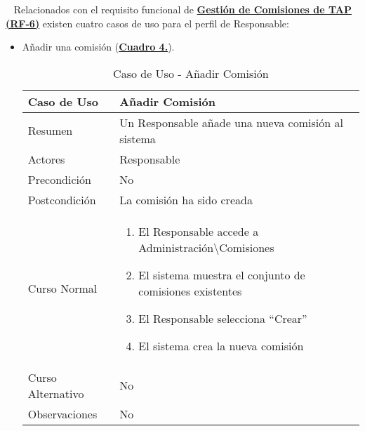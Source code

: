 \newpage~
Relacionados con el requisito funcional de \textbf{\hyperref[tab:rfGestComTAP]{Gestión de Comisiones de TAP (RF-6)}} existen cuatro casos de uso para el perfil de Responsable:
\begin{itemize}
	\item \addtocounter{tabla}{1} Añadir una comisión (\textbf{\hyperref[tab:curCrearComision]{Cuadro 4.}}).
		\begin{table}[!htbp]
		  \centering  \addtocounter{casouso}{1}
		  \begin{tabular}{|l | p{100mm}|}
		    \textbf{Caso de Uso}  & \textbf{Añadir Comisión} \\ \hline
		    Resumen 		 & Un Responsable añade una nueva comisión al sistema \\ \hline
		    Actores  		 & Responsable \\ \hline
		    Precondición  	 & No \\ \hline
		    Postcondición  	 & La comisión ha sido creada \\ \hline
		    Curso Normal   	 & \begin{enumerate}
			  \item El Responsable accede a Administración\textbackslash Comisiones
			  \item El sistema muestra el conjunto de comisiones existentes
			  \item El Responsable selecciona ``Crear''
			  \item El sistema crea la nueva comisión
		    \end{enumerate}  \\ \hline
		    Curso Alternativo  & No  \\ \hline
		    Observaciones 	 & No  \\ \hline
		  \end{tabular}
		  \caption{Caso de Uso  - Añadir Comisión}
		  \label{tab:curCrearComision}
		\end{table}
		\FloatBarrier
	

\end{itemize}

